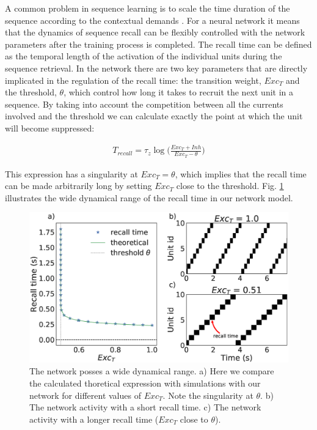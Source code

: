 \documentclass[a4paper]{esannV2}
\begin{document}
A common problem in sequence learning is to scale the time duration of the sequence according to the contextual demands \cite{murray2017learning}. For a neural network it means that the dynamics of sequence recall can be flexibly controlled with the network parameters after the training process is completed. The recall time can be defined as the temporal length of the activation of the individual units during the sequence retrieval. In the network there are two key parameters that are directly implicated in the regulation of the recall time: the transition weight, $Exc_T$ and the threshold, $\theta$, which control how long it takes to recruit the next unit in a sequence.  By taking into account the competition between all the currents involved and the threshold we can calculate exactly the point at which the unit will become suppressed:

\begin{align}
T_{recall} = \tau_z \log\Big(\frac{Exc_T + Inh}{Exc_T - \theta}\Big) \label{eq:recall_complex}
\end{align}

This expression has a singularity at $Exc_T = \theta$, which implies that the recall time can be made arbitrarily long by setting $Exc_T$ close to the threshold. Fig. \ref{Fig:dynamical_range} illustrates the wide dynamical range of the recall time in our network model.

\begin{figure}[h!]
\centering
\includegraphics[scale=0.20]{dynamical_range.eps}
\caption{The network posses a wide dynamical range. a) Here we compare the calculated thoretical expression with simulations with our network for different values of $Exc_T$. Note the singularity at $\theta$. b) The network activity with a short recall time. c) The network activity with a longer recall time ($Exc_T$ close to $\theta$).}\label{Fig:dynamical_range}
\end{figure}
\end{document}
